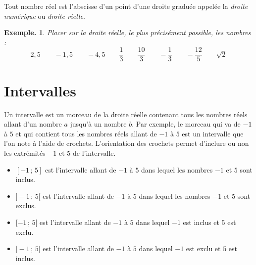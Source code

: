 \documentclass[12pt]{article}
\theoremstyle{break}
\newtheorem*{example}{Exemple.}
\begin{document}
\begin{proposition}{}{}
  \begin{multihide}
  Tout nombre réel est l'abscisse d'un point d'une droite graduée appelée la \emph{droite numérique} ou \emph{droite réelle}.
  \end{multihide}
\end{proposition}

\begin{example}
  Placer sur la droite réelle, le plus précisément possible, les nombres :
  $$2{,}5 \qquad -1{,}5 \qquad -4{,}5 \qquad \dfrac{1}{3} \qquad \dfrac{10}{3} \qquad -\dfrac{1}{3} \qquad -\dfrac{12}{5} \qquad \sqrt{2}$$
\end{example}

\vspace{1em}

\begin{center}
\end{center}

\section{Intervalles}

Un intervalle est un \og morceau \fg{} de la droite réelle contenant tous les nombres réels allant d'un nombre $a$ jusqu'à un nombre $b$. Par exemple, le morceau qui va de $-1$ à $5$ et qui contient tous les nombres réels allant de $-1$ à $5$ est un intervalle que l'on note à l'aide de crochets. L'orientation des crochets permet d'inclure ou non les extrémités $-1$ et $5$ de l'intervalle.

\begin{itemize}
  \item $[-1\,;\,5]$ est l'intervalle allant de $-1$ à $5$ dans lequel les nombres $-1$ et $5$ sont inclus.
  \item $]-1\,;\,5[$ est l'intervalle allant de $-1$ à $5$ dans lequel les nombres $-1$ et $5$ sont exclus.
  \item $[-1\,;\,5[$ est l'intervalle allant de $-1$ à $5$ dans lequel $-1$ est inclus et $5$ est exclu.
  \item $]-1\,;\,5]$ est l'intervalle allant de $-1$ à $5$ dans lequel $-1$ est exclu et $5$ est inclus.
\end{itemize}
\end{document}
